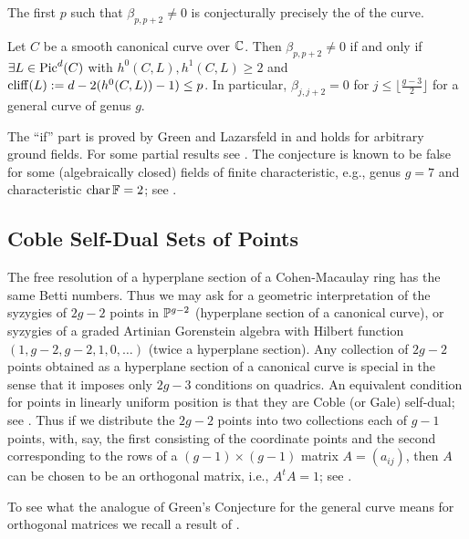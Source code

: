 The first $p$ such that $\beta_{p,p+2}\neq 0$ is conjecturally precisely 
the  of the curve.

\begin{conjecture}\label{GConj} 
Let $C$ be a smooth canonical curve over ${\mathbb C}$. 
Then $\beta_{p,p+2} \ne 0$ if and only if $\exists L\in {\rm{Pic}}^d(C)$ with
$h^0(C,L),h^1(C,L) \ge 2$ and ${\rm{cliff}}(L):=d-2(h^0(C,L))-1) \le p$.
In particular, $\beta_{j,j+2}= 0$ for $j \le \lfloor \frac{g-3}{2} \rfloor$ 
for a general curve of genus $g$.
\end{conjecture}
 
The ``if'' part is proved by Green and Lazarsfeld in \cite{CO:GL} 
and holds for arbitrary ground fields. 
For some partial results see \cite{CO:Vo,CO:Sch2,CO:Sch3,CO:BaEi,CO:vB,CO:HR,CO:Mu}.
The conjecture is known to be false for some (algebraically closed) fields of
finite characteristic, e.g.,
genus $g=7$ and characteristic $\operatorname{char} {\mathbb F}=2$; see \cite{CO:Sch4}.


\subsection{Coble Self-Dual Sets of Points}
The free resolution of a hyperplane section of a Cohen-Macaulay ring 
has the same Betti numbers. Thus we may ask for a geometric
interpretation of the syzygies of $2g-2$ points in ${\mathbb P}^{g-2}$ 
(hyperplane section of a canonical curve), 
or syzygies of a graded Artinian Gorenstein algebra with Hilbert function
$(1,g-2,g-2,1,0,\ldots)$ 
(twice a hyperplane section). 
 Any collection of $2g-2$ points obtained as a hyperplane section of a
 canonical curve is special in the sense that it imposes only $2g-3$
 conditions on quadrics.
An equivalent condition for points in linearly uniform position is that 
they are Coble (or Gale) self-dual; see \cite{CO:EiPo}. 
Thus if we distribute the $2g-2$ points into two collections each of $g-1$ points, 
with, say, the first consisting of the coordinate points
and the second corresponding to the rows of a $(g-1) \times (g-1)$ matrix 
$A=(a_{ij})$, then $A$ can be chosen to be an orthogonal matrix, i.e.,
$A^t A = 1$; see \cite{CO:EiPo}.

To see what the analogue of Green's Conjecture for the general curve means for
orthogonal matrices we recall a result of \cite{CO:RS1}.

